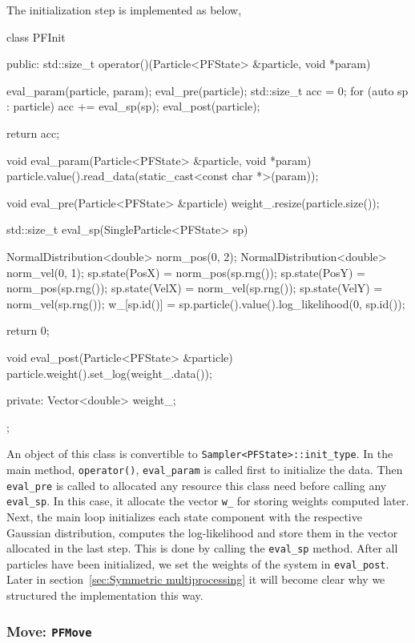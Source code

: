 The initialization step is implemented as below,
\begin{cppcode}
  class PFInit
  {
      public:
      std::size_t operator()(Particle<PFState> &particle, void *param)
      {
          eval_param(particle, param);
          eval_pre(particle);
          std::size_t acc = 0;
          for (auto sp : particle)
              acc += eval_sp(sp);
          eval_post(particle);

          return acc;
      }

      void eval_param(Particle<PFState> &particle, void *param)
      {
          particle.value().read_data(static_cast<const char *>(param));
      }

      void eval_pre(Particle<PFState> &particle)
      {
          weight_.resize(particle.size());
      }

      std::size_t eval_sp(SingleParticle<PFState> sp)
      {
          NormalDistribution<double> norm_pos(0, 2);
          NormalDistribution<double> norm_vel(0, 1);
          sp.state(PosX) = norm_pos(sp.rng());
          sp.state(PosY) = norm_pos(sp.rng());
          sp.state(VelX) = norm_vel(sp.rng());
          sp.state(VelY) = norm_vel(sp.rng());
          w_[sp.id()] = sp.particle().value().log_likelihood(0, sp.id());

          return 0;
      }

      void eval_post(Particle<PFState> &particle)
      {
          particle.weight().set_log(weight_.data());
      }

      private:
      Vector<double> weight_;
  };
\end{cppcode}
An object of this class is convertible to \verb|Sampler<PFState>::init_type|.
In the main method, \verb|operator()|, \verb|eval_param| is called first to
initialize the data. Then \verb|eval_pre| is called to allocated any resource
this class need before calling any \verb|eval_sp|. In this case, it allocate
the vector \verb|w_| for storing weights computed later. Next, the main loop
initializes each state component with the respective Gaussian distribution,
computes the log-likelihood and store them in the vector allocated in the last
step. This is done by calling the \verb|eval_sp| method. After all particles
have been initialized, we set the weights of the system in \verb|eval_post|.
Later in section~\ref{sec:Symmetric multiprocessing} it will become clear why
we structured the implementation this way.

\subsubsection{Move: \texttt{PFMove}}

